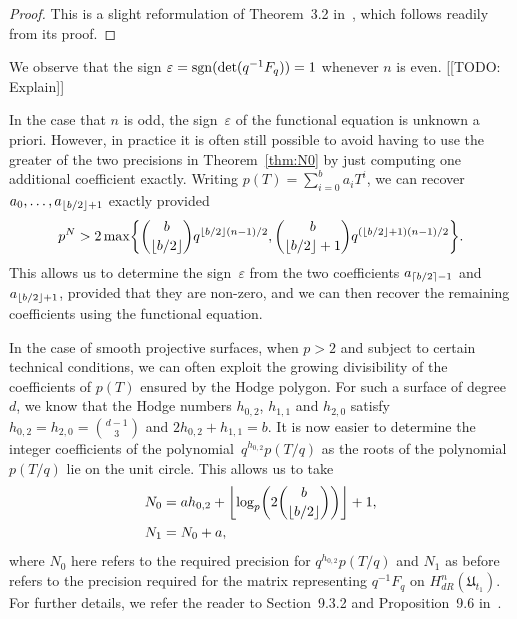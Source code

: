 \begin{proof}
This is a slight reformulation of {Theorem~3.2} in~\citep{Gerkmann2007}, 
which follows readily from its proof.
\end{proof}

\begin{rem}
We observe that the sign $\varepsilon = \operatorname{sgn}(\det(q^{-1} F_q)) = 1$ 
whenever $n$ is even.  [[TODO:  Explain]]
\end{rem}

\begin{rem}
In the case that $n$ is odd, the sign~$\varepsilon$ of the functional 
equation is unknown a priori.  However, in practice it is often still 
possible to avoid having to use the greater of the two precisions in 
Theorem~\ref{thm:N0} by just computing one additional coefficient 
exactly.  Writing $p(T) = \sum_{i=0}^{b} a_i T^i$, we can recover 
$a_0, \dotsc, a_{\left\lfloor b/2\right\rfloor+1}$ exactly provided 
\begin{equation*}
p^N > 2 \max\biggl\{\binom{b}{\left\lfloor b/2\right\rfloor} q^{\left\lfloor b/2\right\rfloor (n-1) / 2}, 
                   \binom{b}{\left\lfloor b/2\right\rfloor+1} q^{(\left\lfloor b/2\right\rfloor+1) (n-1)/2} \biggr\}.
\end{equation*}
This allows us to determine the sign~$\varepsilon$ from the two 
coefficients $a_{\left\lceil b/2\right\rceil-1}$ and $a_{\left\lfloor b/2\right\rfloor+1}$, provided 
that they are non-zero, and we can then recover the remaining 
coefficients using the functional equation.
\end{rem}

\begin{rem} \label{rem:N0Surfaces}
In the case of smooth projective surfaces, when $p > 2$ and subject to 
certain technical conditions, we can often exploit the growing divisibility 
of the coefficients of $p(T)$ ensured by the Hodge polygon.  For such a surface 
of degree~$d$, we know that the Hodge numbers $h_{0,2}$, $h_{1,1}$ and $h_{2,0}$ 
satisfy $h_{0,2} = h_{2,0} = \binom{d-1}{3}$ and $2 h_{0,2} + h_{1,1} = b$. 
It is now easier to determine the integer coefficients of the 
polynomial~$q^{h_{0,2}} p(T/q)$ as the roots of the polynomial $p(T/q)$ lie 
on the unit circle.  This allows us to take 
\begin{align*}
N_0 & = a h_{0,2} + \left\lfloor\log_p \biggl( 2 \binom{b}{\left\lfloor b/2\right\rfloor}\biggr)\right\rfloor + 1,\\
N_1 & = N_0 + a,
\end{align*}
where $N_0$ here refers to the required precision for $q^{h_{0,2}} p(T/q)$ 
and $N_1$ as before refers to the precision required for the matrix 
representing $q^{-1} F_q$ on $H_{dR}^{n}(\mathfrak{U}_{t_1})$.
For further details, we refer the reader to {Section~9.3.2} 
and {Proposition~9.6} in~\citep{Lauder2006}.
\end{rem}

